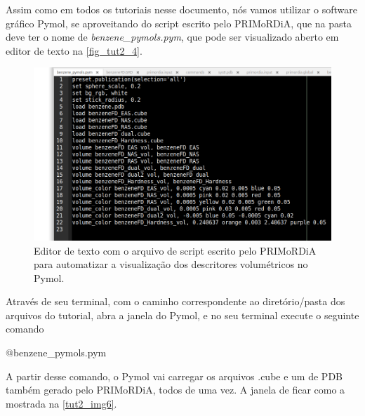 \documentclass[a4paper,11pt]{refart}
\begin{document}
Assim como em todos os tutoriais nesse documento, nós vamos utilizar o software gráfico Pymol, se aproveitando do script escrito pelo PRIMoRDiA, que na pasta deve ter o nome de \emph{benzene\_pymols.pym}, que pode ser visualizado aberto em editor de texto na \autoref{fig_tut2_4}. 

\hspace*{-\leftmarginwidth}
\begin{minipage}{\fullwidth}
	\begin{figure}[H]
		\begin{center}
			\includegraphics[width=4.5in]{images/tut2_img5}
			\caption{Editor de texto com o arquivo de script escrito pelo PRIMoRDiA para automatizar a visualização dos descritores volumétricos no Pymol.}
			\label{fig_tut2_4}
		\end{center}
	\end{figure}
\end{minipage}

Através de seu terminal, com o caminho correspondente ao diretório/pasta dos arquivos do tutorial, abra a janela do Pymol, e no seu terminal execute o seguinte comando 

\hspace*{-\leftmarginwidth}
\begin{minipage}{\fullwidth}
	\begin{pymol}@benzene_pymols.pym\end{pymol}
\end{minipage}
 
A partir desse comando, o Pymol vai carregar os arquivos .cube e um de PDB também gerado pelo PRIMoRDiA, todos de uma vez. A janela de ficar como a mostrada na \autoref{tut2_img6}.
\end{document}
